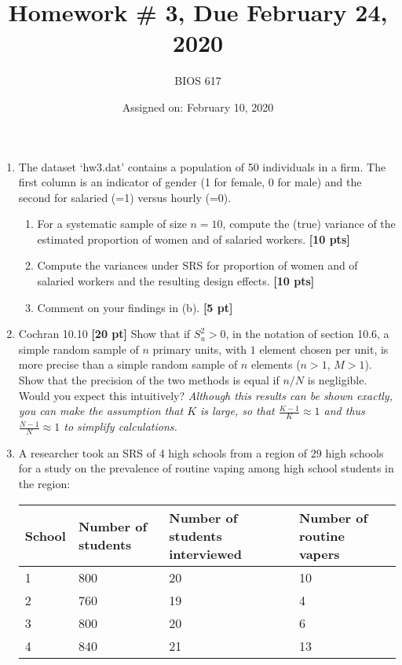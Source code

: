 \documentclass[12pt]{article}
\begin{document}
\title{Homework \# 3, Due February 24, 2020}
\author{BIOS 617}
\date{Assigned on: February 10, 2020}

\maketitle

\begin{enumerate}
\setlength{\itemsep}{15pt}%
\setlength{\parskip}{15pt}%

\item  The dataset `hw3.dat' contains a population of 50 individuals in a firm. The first column is an indicator of gender (1 for female, 0 for male) and the second for salaried (=1) versus hourly (=0).
	\begin{enumerate}
	\item For a systematic sample of size $n=10$, compute the (true) variance of the estimated proportion of women and of salaried workers. {\bf [10 pts]}
	\item Compute the variances under SRS for proportion of women and of salaried workers and the resulting design effects. {\bf [10 pts]}
	\item Comment on your findings in (b). {\bf [5 pt]}
	\end{enumerate}

\item Cochran 10.10 {\bf [20 pt]} Show that if $S_u^2 >0$, in the notation of section 10.6, a simple random sample of $n$ primary units, with $1$ element chosen per unit, is more precise than a simple random sample of $n$ elements ($n>1$, $M>1$). Show that the precision of the two methods is equal if $n/N$ is negligible. Would you expect this intuitively? \emph{Although this results can be shown exactly, you can make the assumption that $K$ is large, so that $\frac{K-1}{K} \approx 1$ and thus $\frac{N-1}{N} \approx 1$ to simplify calculations.}

\item A researcher took an SRS of 4 high schools from a region of 29 high schools for a study on the prevalence of routine vaping among high school students in the region:

\begin{table}[!th]
\centering
\begin{tabular}{p{1in} | p{1in} p{1in} p{1in}}
School & Number of students & Number of students interviewed & Number of routine vapers \\ \hline
1 & 800 & 20 & 10 \\
2 & 760 & 19 & 4 \\
3 & 800 & 20 & 6 \\
4 & 840 & 21 & 13 \\ \hline
\end{tabular}
\end{table}


\end{enumerate}
\end{document}
